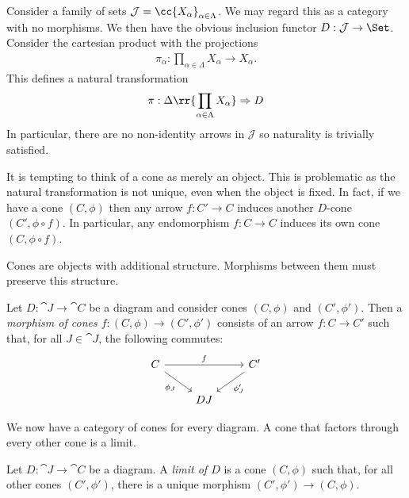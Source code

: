 \documentclass{article}
\begin{document}
\begin{example}
  Consider a family of sets $\mathcal J=\cc{X_\alpha}_{\alpha\in\Lambda}$. We may
  regard this as a category with no morphisms. We then have
  the obvious inclusion functor $D:\mathcal J\to\Set$. Consider the cartesian
  product with the projections
  \begin{align*}
    \pi_\alpha : \prod_{\alpha\in\Lambda} X_\alpha \to X_\alpha.
  \end{align*}
  This defines a natural transformation
  \begin{align*}
    \pi : \Delta\rr{\prod_{\alpha\in\Lambda} X_\alpha}\Rightarrow D
  \end{align*}
  In particular, there are no non-identity arrows in $\mathcal J$ so
  naturality is trivially satisfied.
\end{example}

It is tempting to think of a cone as merely an object. This is problematic as
the natural transformation is not unique, even when the object is fixed. In
fact, if we have a cone $(C,\phi)$ then any arrow $f:C'\to C$ induces another
$D$-cone $(C',\phi\circ f)$. In particular, any endomorphism $f:C\to C$ induces
its own cone $(C,\phi\circ f)$.


Cones are objects with additional structure. Morphisms between them must preserve
this structure.

\begin{definition}
  Let $D:\cat{J}\to\cat{C}$ be a diagram and consider cones $(C,\phi)$ and
  $(C',\phi')$. Then a \emph{morphism of cones $f:(C,\phi)\to(C',\phi')$} consists of
  an arrow $f:C\to C'$ such that, for all $J\in\cat{J}$, the following
  commutes:
  \begin{equation}
    \begin{tikzcd}
      C && {C'} \\
        & DJ
        \arrow["f", from=1-1, to=1-3]
        \arrow["{\phi_J'}", from=1-3, to=2-2]
        \arrow["{\phi_J}"', from=1-1, to=2-2]
    \end{tikzcd}
  \end{equation}
\end{definition}

We now have a category of cones for every diagram.
A cone that factors through every other cone is a limit.

\begin{definition}
  Let $D:\cat{J}\to\cat{C}$ be a diagram. A \emph{limit of $D$} is a cone
  $(C,\phi)$ such that, for all other cones $(C',\phi')$, there is a unique morphism
  $(C',\phi')\to(C,\phi)$.
\end{definition}
\end{document}
